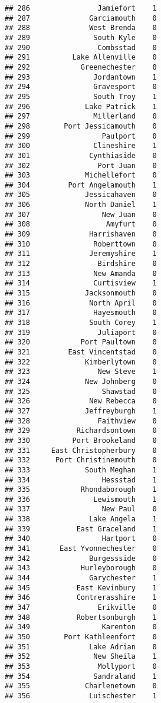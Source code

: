 \documentclass[
]{article}
\begin{document}
\begin{verbatim}
## 286                Jamiefort    1
## 287              Garciamouth    0
## 288              West Brenda    0
## 289               South Kyle    0
## 290                Combsstad    0
## 291          Lake Allenville    0
## 292            Greenechester    0
## 293               Jordantown    1
## 294               Gravesport    0
## 295               South Troy    1
## 296             Lake Patrick    1
## 297               Millerland    0
## 298        Port Jessicamouth    0
## 299                 Paulport    0
## 300               Clineshire    1
## 301              Cynthiaside    0
## 302                Port Juan    0
## 303             Michellefort    0
## 304         Port Angelamouth    1
## 305             Jessicahaven    0
## 306             North Daniel    1
## 307                 New Juan    0
## 308                  Amyfurt    0
## 309              Harrishaven    0
## 310               Roberttown    0
## 311              Jeremyshire    1
## 312                Birdshire    0
## 313               New Amanda    0
## 314               Curtisview    1
## 315             Jacksonmouth    0
## 316              North April    0
## 317               Hayesmouth    0
## 318              South Corey    1
## 319                Juliaport    0
## 320            Port Paultown    0
## 321         East Vincentstad    0
## 322             Kimberlytown    0
## 323                New Steve    1
## 324             New Johnberg    0
## 325                 Shawstad    0
## 326              New Rebecca    0
## 327             Jeffreyburgh    1
## 328                Faithview    0
## 329           Richardsontown    0
## 330          Port Brookeland    0
## 331     East Christopherbury    0
## 332      Port Christinemouth    0
## 333             South Meghan    1
## 334                 Hessstad    1
## 335            Rhondaborough    1
## 336               Lewismouth    1
## 337                 New Paul    0
## 338              Lake Angela    1
## 339           East Graceland    1
## 340                 Hartport    0
## 341       East Yvonnechester    0
## 342              Burgessside    0
## 343            Hurleyborough    0
## 344              Garychester    1
## 345           East Kevinbury    1
## 346           Contrerasshire    1
## 347                Erikville    0
## 348           Robertsonburgh    1
## 349                 Karenton    0
## 350        Port Kathleenfort    0
## 351              Lake Adrian    0
## 352               New Sheila    1
## 353                Mollyport    0
## 354               Sandraland    1
## 355             Charlenetown    0
## 356              Luischester    1

\end{verbatim}
\end{document}
